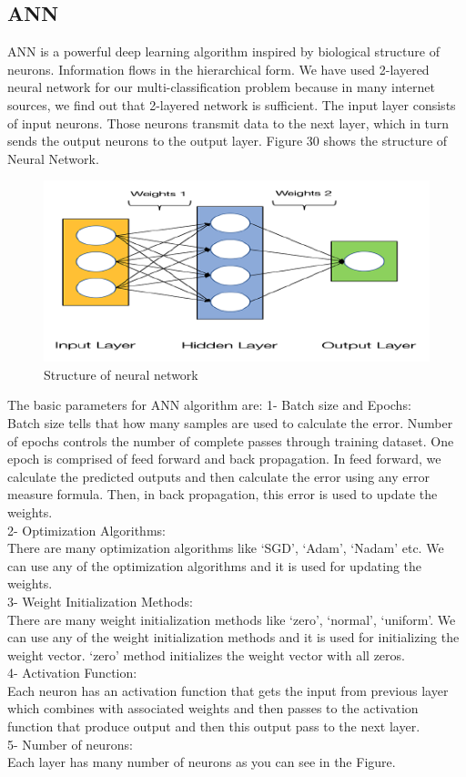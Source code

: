 \subsection{ANN}
ANN is a powerful deep learning algorithm inspired by biological structure of neurons. Information flows in the hierarchical form. We have used 2-layered neural network for our multi-classification problem because in many internet sources, we find out that 2-layered network is sufficient. The input layer consists of input neurons. Those neurons transmit data to
the next layer, which in turn sends the output neurons to the output layer. Figure 30 shows the structure of Neural Network.

\begin{figure}[h]
  		\centering
    		\includegraphics[scale=0.85]{./Figures/ANN}
\caption{Structure of neural network}
\label{fig:7}
 		\end{figure}

The basic parameters for ANN algorithm are:
1- Batch size and Epochs:\\
Batch size tells that how many samples are used to calculate the error. Number of epochs controls the number of complete passes through training dataset. One epoch is comprised of feed forward and back propagation. In feed forward, we calculate the predicted outputs and then calculate the error using any error measure formula. Then, in back propagation, this error is used to update the weights.\\
2- Optimization Algorithms:\\
There are many optimization algorithms like ‘SGD’, ‘Adam’, ‘Nadam’ etc. We can use any of the optimization algorithms and it is used for updating the weights.\\
3- Weight Initialization Methods:\\
There are many weight initialization methods like ‘zero’, ‘normal’, ‘uniform’. We can use any of the weight initialization methods and it is used for initializing the weight vector. ‘zero’ method initializes the weight vector with all zeros.\\
4- Activation Function:\\
Each neuron has an activation function that gets the input from previous layer which combines with associated weights and then passes to the activation function that produce output and then this output pass to the next layer.\\
5- Number of neurons:\\
Each layer has many number of neurons as you can see in the Figure.

